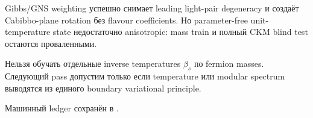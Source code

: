 \begin{theorem}
Gibbs/GNS weighting успешно снимает leading light-pair degeneracy и создаёт
Cabibbo-plane rotation без flavour coefficients. Но parameter-free
unit-temperature state недостаточно anisotropic: mass train и полный CKM
blind test остаются проваленными.
\end{theorem}

\begin{nogocriterion}
Нельзя обучать отдельные inverse temperatures \(\beta_s\) по fermion masses.
Следующий pass допустим только если temperature или modular spectrum выводятся
из единого boundary variational principle.
\end{nogocriterion}

Машинный ledger сохранён в
.